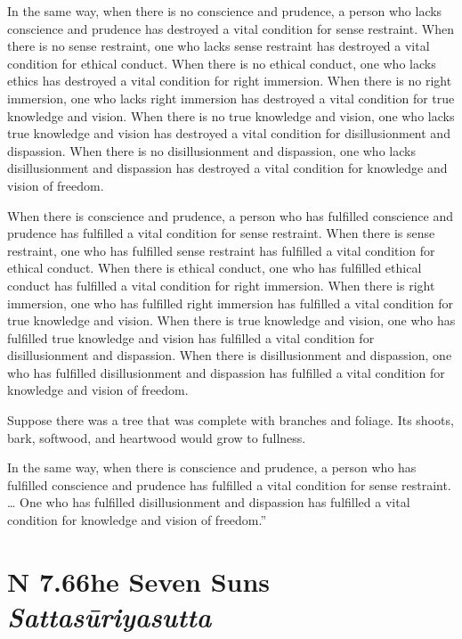 \documentclass[12pt,openany]{book}%
\newcommand*{\suttatitleacronym}[1]{\smaller[2]{#1}\vspace*{.3em}}
\newcommand*{\suttatitletranslation}[1]{\linebreak{#1}}
\newcommand*{\suttatitleroot}[1]{\linebreak\smaller[2]\itshape{#1}}
\newcommand*{\tocacronym}[1]{\hspace*{-3.3em}{#1}\quad}
\newcommand*{\toctranslation}[1]{#1}
\newcommand*{\tocroot}[1]{(\textit{#1})}
\begin{document}
In the same way, when there is no conscience and prudence, a person who lacks conscience and prudence has destroyed a vital condition for sense restraint. When there is no sense restraint, one who lacks sense restraint has destroyed a vital condition for ethical conduct. When there is no ethical conduct, one who lacks ethics has destroyed a vital condition for right immersion. When there is no right immersion, one who lacks right immersion has destroyed a vital condition for true knowledge and vision. When there is no true knowledge and vision, one who lacks true knowledge and vision has destroyed a vital condition for disillusionment and dispassion. When there is no disillusionment and dispassion, one who lacks disillusionment and dispassion has destroyed a vital condition for knowledge and vision of freedom. 

When there is conscience and prudence, a person who has fulfilled conscience and prudence has fulfilled a vital condition for sense restraint. When there is sense restraint, one who has fulfilled sense restraint has fulfilled a vital condition for ethical conduct. When there is ethical conduct, one who has fulfilled ethical conduct has fulfilled a vital condition for right immersion. When there is right immersion, one who has fulfilled right immersion has fulfilled a vital condition for true knowledge and vision. When there is true knowledge and vision, one who has fulfilled true knowledge and vision has fulfilled a vital condition for disillusionment and dispassion. When there is disillusionment and dispassion, one who has fulfilled disillusionment and dispassion has fulfilled a vital condition for knowledge and vision of freedom. 

Suppose there was a tree that was complete with branches and foliage. Its shoots, bark, softwood, and heartwood would grow to fullness. 

In the same way, when there is conscience and prudence, a person who has fulfilled conscience and prudence has fulfilled a vital condition for sense restraint. … One who has fulfilled disillusionment and dispassion has fulfilled a vital condition for knowledge and vision of freedom.” 

%
\section*{{\suttatitleacronym AN 7.66}{\suttatitletranslation The Seven Suns }{\suttatitleroot Sattasūriyasutta}}
\addcontentsline{toc}{section}{\tocacronym{AN 7.66} \toctranslation{The Seven Suns } \tocroot{Sattasūriyasutta}}
\end{document}
